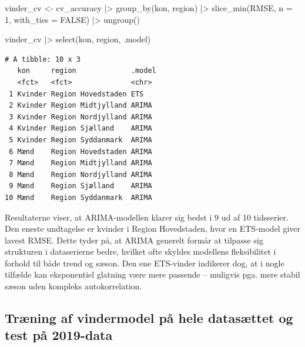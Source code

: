 \documentclass[
]{article}
\newenvironment{Shaded}{\begin{snugshade}}{\end{snugshade}}
\newcommand{\AttributeTok}[1]{\textcolor[rgb]{0.40,0.45,0.13}{#1}}
\newcommand{\ConstantTok}[1]{\textcolor[rgb]{0.56,0.35,0.01}{#1}}
\newcommand{\DecValTok}[1]{\textcolor[rgb]{0.68,0.00,0.00}{#1}}
\newcommand{\FunctionTok}[1]{\textcolor[rgb]{0.28,0.35,0.67}{#1}}
\newcommand{\NormalTok}[1]{\textcolor[rgb]{0.00,0.23,0.31}{#1}}
\newcommand{\OtherTok}[1]{\textcolor[rgb]{0.00,0.23,0.31}{#1}}
\newcommand{\SpecialCharTok}[1]{\textcolor[rgb]{0.37,0.37,0.37}{#1}}
\begin{document}
\begin{Shaded}
\begin{Highlighting}[]
\NormalTok{vinder\_cv }\OtherTok{\textless{}{-}}\NormalTok{ cv\_accuracy }\SpecialCharTok{|\textgreater{}}
  \FunctionTok{group\_by}\NormalTok{(kon, region) }\SpecialCharTok{|\textgreater{}}
  \FunctionTok{slice\_min}\NormalTok{(RMSE, }\AttributeTok{n =} \DecValTok{1}\NormalTok{, }\AttributeTok{with\_ties =} \ConstantTok{FALSE}\NormalTok{) }\SpecialCharTok{|\textgreater{}}
  \FunctionTok{ungroup}\NormalTok{()}

\NormalTok{vinder\_cv }\SpecialCharTok{|\textgreater{}} \FunctionTok{select}\NormalTok{(kon, region, .model)}
\end{Highlighting}
\end{Shaded}

\begin{verbatim}
# A tibble: 10 x 3
   kon     region             .model
   <fct>   <fct>              <chr> 
 1 Kvinder Region Hovedstaden ETS   
 2 Kvinder Region Midtjylland ARIMA 
 3 Kvinder Region Nordjylland ARIMA 
 4 Kvinder Region Sjælland    ARIMA 
 5 Kvinder Region Syddanmark  ARIMA 
 6 Mænd    Region Hovedstaden ARIMA 
 7 Mænd    Region Midtjylland ARIMA 
 8 Mænd    Region Nordjylland ARIMA 
 9 Mænd    Region Sjælland    ARIMA 
10 Mænd    Region Syddanmark  ARIMA 
\end{verbatim}

Resultaterne viser, at ARIMA-modellen klarer sig bedst i 9 ud af 10
tidsserier. Den eneste undtagelse er kvinder i Region Hovedstaden, hvor
en ETS-model giver lavest RMSE. Dette tyder på, at ARIMA generelt formår
at tilpasse sig strukturen i dataserierne bedre, hvilket ofte skyldes
modellens fleksibilitet i forhold til både trend og sæson. Den ene
ETS-vinder indikerer dog, at i nogle tilfælde kan eksponentiel glatning
være mere passende -- muligvis pga. mere stabil sæson uden kompleks
autokorrelation.

\subsection{Træning af vindermodel på hele datasættet og test på
2019-data}\label{truxe6ning-af-vindermodel-puxe5-hele-datasuxe6ttet-og-test-puxe5-2019-data}
\end{document}
